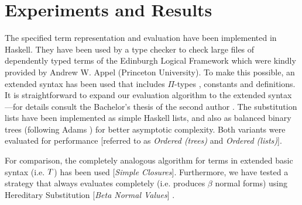 \documentclass[submission,copyright,creativecommons]{eptcs}
\begin{document}
%
%











\section{Experiments and Results}
\label{sec:experiments}

The specified term representation and evaluation have been implemented
in Haskell. They have been used by a type checker to check large files
of dependently
typed terms of the Edinburgh Logical Framework which were kindly
provided by Andrew W. Appel (Princeton University). To make this
possible, an extended syntax has been used that includes $\Pi$-types%
, constants and definitions. It is straightforward to expand our
evaluation algorithm to the extended syntax---for details consult the
Bachelor's thesis of the second author \cite{kraus:bachelor}. 
The substitution lists
have been implemented as simple Haskell lists, and also as balanced
binary trees (following Adams \cite{adams:jfp93})
for better asymptotic complexity.  Both variants were
evaluated for performance 
[referred to as \emph{Ordered (trees)} and \emph{Ordered (lists)}].

For comparison, the completely analogous algorithm for terms in
extended basic syntax (i.e. $T$) has been used [\emph{Simple
  Closures}]. Furthermore, we have tested a strategy that always
evaluates completely (i.e. produces $\beta$ normal forms) using
Hereditary Substitution [\emph{Beta Normal Values}]
\cite{watkins:concurrentlftr}.
\end{document}
